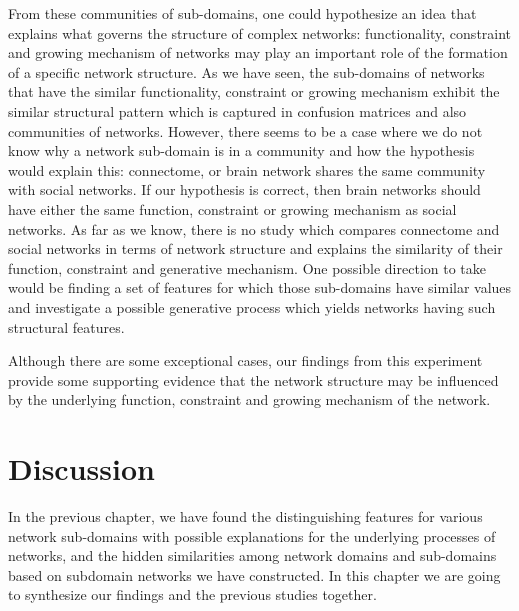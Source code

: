 \documentclass{article}
\begin{document}
From these communities of sub-domains, one could hypothesize an idea that explains what governs the structure of complex networks: functionality, constraint and growing mechanism of networks may play an important role of the formation of a specific network structure. As we have seen, the sub-domains of networks that have the similar functionality, constraint or growing mechanism exhibit the similar structural pattern which is captured in confusion matrices and also communities of networks. However, there seems to be a case where we do not know why a network sub-domain is in a community and how the hypothesis would explain this: connectome, or brain network shares the same community with social networks. If our hypothesis is correct, then brain networks should have either the same function, constraint or growing mechanism as social networks. As far as we know, there is no study which compares connectome and social networks in terms of network structure and explains the similarity of their function, constraint and generative mechanism. One possible direction to take would be finding a set of features for which those sub-domains have similar values and investigate a possible generative process which yields networks having such structural features.

Although there are some exceptional cases, our findings from this experiment provide some supporting evidence that the network structure may be influenced by the underlying function, constraint and growing mechanism of the network.


\newpage
\section{Discussion}
In the previous chapter, we have found the distinguishing features for various network sub-domains with possible explanations for the underlying processes of networks, and the hidden similarities among network domains and sub-domains based on subdomain networks we have constructed. In this chapter we are going to synthesize our findings and the previous studies together.
\end{document}
